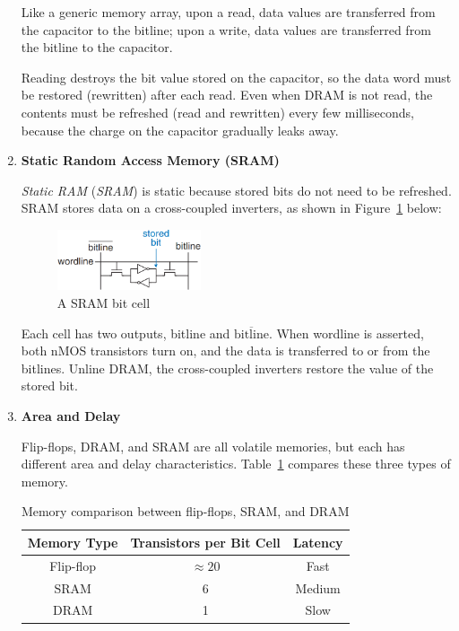 \documentclass[12pt]{article}
\numberwithin{figure}{subsection}
\numberwithin{table}{subsection}
\numberwithin{equation}{subsection}
\begin{document}
\begin{enumerate}
  Like a generic memory array, upon a read, data values are transferred from the capacitor to the bitline; upon a write, data values are transferred from the bitline to the capacitor.

  Reading destroys the bit value stored on the capacitor, so the data word must be restored (rewritten) after each read. Even when DRAM is not read, the contents must be refreshed (read and rewritten) every few milliseconds, because the charge on the capacitor gradually leaks away.

  \item \textbf{Static Random Access Memory (SRAM)}

  \textit{Static RAM} (\textit{SRAM}) is static because stored bits do not need to be refreshed. SRAM stores data on a cross-coupled inverters, as shown in Figure~\ref{fig:sram_bit_cell} below:

  \begin{figure}[ht]
    \centering
    \includegraphics[width=0.4\textwidth]{sram_bit_cell.png}
    \caption{A SRAM bit cell}
    \label{fig:sram_bit_cell}
  \end{figure}

  Each cell has two outputs, bitline and $\overline{\text{bitline}}$. When wordline is asserted, both nMOS transistors turn on, and the data is transferred to or from the bitlines. Unline DRAM, the cross-coupled inverters restore the value of the stored bit.

  \item \textbf{Area and Delay}

  Flip-flops, DRAM, and SRAM are all volatile memories, but each has different area and delay characteristics. Table~\ref{tab:memory_comparison} compares these three types of memory.

  \begin{table}[ht]
    \centering
    \begin{tabular}{ | c | c | c | }
    \hline
    \textbf{Memory Type} & \textbf{Transistors per Bit Cell} & \textbf{Latency} \\ \hline
    Flip-flop            & $\approx 20$                      & Fast             \\ \hline
    SRAM                 & 6                                 & Medium           \\ \hline
    DRAM                 & 1                                 & Slow             \\ \hline
    \end{tabular}
    \caption{Memory comparison between flip-flops, SRAM, and DRAM}
    \label{tab:memory_comparison}
  \end{table}


\end{enumerate}
\end{document}

